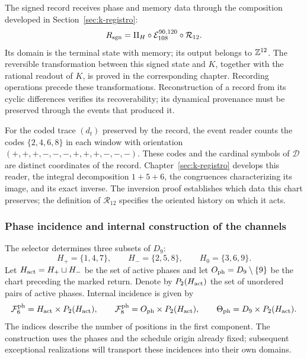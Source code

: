 The signed record receives phase and memory data through the
composition developed in Section~\ref{sec:k-registro}:
\begin{equation}
 R_{\rm sgn}=\Pi_H\circ\mathcal E_{108}^{90,120}
                         \circ\mathcal R_{12}.
 \label{tpk-int:registro-causal}
\end{equation}
Its domain is the terminal state with memory; its output belongs to
\(\mathbb Z^{12}\). The reversible transformation between this signed state
and \(K\), together with the rational readout of \(K\), is proved in
the corresponding chapter. Recording operations precede
these transformations. Reconstruction of a record from its cyclic
differences verifies its recoverability; its dynamical provenance
must be preserved through the events that produced it.

For the coded trace \((d_t)\) preserved by the record, the
event reader counts the codes \(\{2,4,6,8\}\) in each
window with orientation
\((+,+,+,-,-,-,+,+,+,-,-,-)\). These codes and the cardinal
symbols of \(\mathcal D\) are distinct coordinates of the
record. Chapter~\ref{sec:k-registro} develops this reader,
the integral decomposition \(1+5+6\), the congruences
characterizing its image, and its exact inverse. The inversion proof
establishes which data this chart preserves; the definition of
\(\mathcal R_{12}\) specifies the oriented history on which
it acts.

\subsubsection{Phase incidence and internal construction of the channels}
\label{tpk-int:incidencia}

The selector determines three subsets of \(D_9\):
\[
 H_+=\{1,4,7\},\qquad H_-=\{2,5,8\},\qquad H_0=\{3,6,9\}.
\]
Let \(H_{\rm act}=H_+\sqcup H_-\) be the set of active phases and
let \(O_{\rm ph}=D_9\setminus\{9\}\) be the chart preceding the marked
return. Denote by \(P_2(H_{\rm act})\) the set of unordered pairs
of active phases. Internal incidence is given by
\begin{equation}
 \mathcal F^{\rm ph}_6=H_{\rm act}\times P_2(H_{\rm act}),\qquad
 \mathcal F^{\rm ph}_8=O_{\rm ph}\times P_2(H_{\rm act}),\qquad
 \Theta_{\rm ph}=D_9\times P_2(H_{\rm act}).
 \label{tpk-int:fases90120}
\end{equation}
The indices describe the number of positions in the first component.
The construction uses the phases and the schedule origin already fixed;
subsequent exceptional realizations will transport these
incidences into their own domains.

